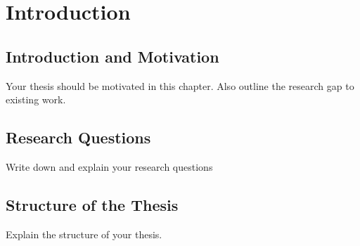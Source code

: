 \chapter{Introduction}
\label{ch:introduction}

% 


\section{Introduction and Motivation}

Your thesis should be motivated in this chapter. Also outline the research gap to existing work.  


\section{Research Questions}
	\label{sec:reserach_questions}

Write down and explain your research questions

\section{Structure of the Thesis}
\label{sec:structure_of_the_thesis}

Explain the structure of your thesis.



